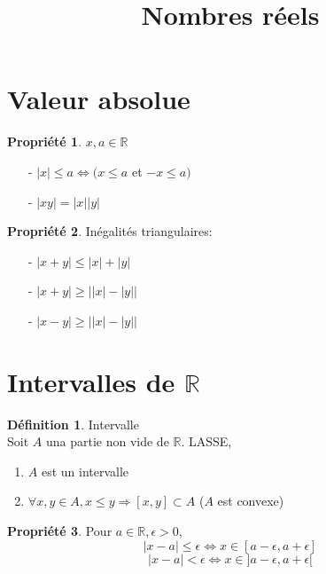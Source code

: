 \documentclass[fleqn]{article}
\title{Nombres r\'eels}
\date{}
\theoremstyle{definition} \newtheorem*{defi}{D\'efinition}
\theoremstyle{definition} \newtheorem*{theo}{Th\'eor\`eme}
\theoremstyle{definition} \newtheorem*{coro}{Corollaire}
\theoremstyle{remark} \newtheorem*{rqs}{Remarques}
\theoremstyle{definition} \newtheorem*{prop}{Propri\'et\'e}
\begin{document}
\maketitle

\section{Valeur absolue}
\begin{prop} $x,a \in \mathbb{R}$
	\begin{itemize}
		\item [-] $|x| \leq a \Leftrightarrow (x \leq a$ et $-x \leq a)$
		\item [-] $|xy| = |x||y|$
	\end{itemize}
\end{prop}
\begin{prop} In\'egalit\'es triangulaires:
	\begin{itemize}
		\item [-] $|x+y| \leq |x| + |y|$
		\item [-] $|x+y| \geq \big||x| - |y|\big|$
		\item [-] $|x-y| \geq \big||x| - |y|\big|$
	\end{itemize}
\end{prop}

\section{Intervalles de $\mathbb{R}$}
\begin{defi} Intervalle \\
	Soit $A$ una partie non vide de $\mathbb{R}$. LASSE,
	\begin{enumerate}
		\item $A$ est un intervalle
		\item $\forall x,y \in A, x \leq y \Rightarrow [x,y] \subset A$ ($A$ est convexe)
	\end{enumerate}
\end{defi}
\begin{prop}
	Pour $a \in \mathbb{R}, \epsilon > 0$,
	\[|x-a| \leq \epsilon \Leftrightarrow x \in [a - \epsilon, a + \epsilon]\]
	\[|x-a| < \epsilon \Leftrightarrow x \in ]a - \epsilon, a + \epsilon[\]
\end{prop}

\end{document}
